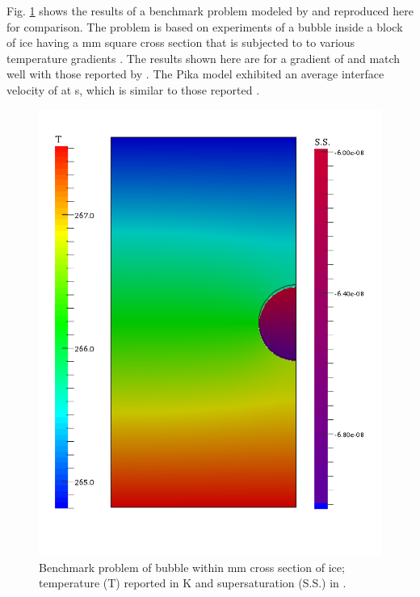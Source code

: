 Fig. \ref{fig:bubble} shows the results of a benchmark problem modeled by \citet{kaempfer2009phase} and reproduced here for comparison. The problem is based on experiments of a bubble inside a block of ice having a \unit[5]{mm} square cross section that is subjected to to various temperature gradients \citep{nakaya1956technical, stehle1965technical}. The results shown here are for a gradient of  and match well with those reported by \citet{kaempfer2009phase}. The Pika model exhibited an average interface velocity of  at \unit[7200]{s}, which is similar to those reported \citet{kaempfer2009phase}.

\begin{figure}[H]
  \includegraphics[width=\linewidth]{figures/bubble.pdf}
  \caption{Benchmark problem of bubble within \unit[5]{mm} cross section of ice; temperature (T) reported in \unit[]{K} and supersaturation (S.S.) in .}
  \label{fig:bubble}
\end{figure}

